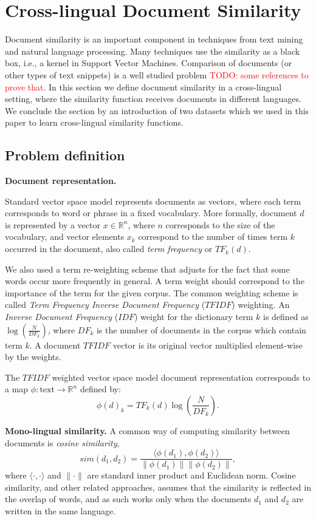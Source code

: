 \documentclass[twoside,11pt]{article}
\newcommand{\todo}[1]{\textcolor{red}{TODO: #1}}
\newcommand{\RR}{\mathbb{R}}
\begin{document}
\section{Cross-lingual Document Similarity}

Document similarity is an important component in techniques from text mining and natural language processing. Many techniques use the similarity as a black box, i.e., a kernel in Support Vector Machines. Comparison of documents (or other types of text snippets) is a well studied problem \todo{some references to prove that}. In this section we define document similarity in a cross-lingual setting, where the similarity function receives documents in different languages. We conclude the section by an introduction of two datasets which we used in this paper to learn cross-lingual similarity functions.

\subsection{Problem definition}

\textbf{Document representation.}

Standard vector space model \cite{xxx} represents documents as vectors, where each term corresponds to word or phrase in a fixed vocabulary. More formally, document $d$ is represented by a vector $x \in \RR^n$, where $n$ corresponds to the size of the vocabulary, and vector elements $x_k$ correspond to the number of times term $k$ occurred in the document, also called \emph{term frequency} or $TF_k(d)$.

We also used a term re-weighting scheme that adjusts for the fact that some words occur more frequently in general. A term weight should correspond to the importance of the term for the given corpus. The common weighting scheme is called \emph{Term Frequency Inverse Document Frequency} ($TFIDF$) weighting. An \emph{Inverse Document Frequency} ($IDF$) weight for the dictionary term $k$ is defined as $\log( \frac{N}{DF_k} )$, where $DF_k$ is the number of documents in the corpus which contain term $k$.  A document $TFIDF$ vector is its original vector multiplied element-wise by the weights.

The $TFIDF$ weighted vector space model document representation corresponds to a map $\phi : \text{text} \rightarrow \RR^n$ defined by:
$$\phi(d)_k = {TF}_k(d) \log( \frac{N}{{DF}_k}).$$

\textbf {Mono-lingual similarity.}
A common way of computing similarity between documents is \emph{cosine similarity},
$$sim(d_1, d_2) = \frac{\langle \phi(d_1), \phi(d_2)\rangle}{\|\phi(d_1)\| \|\phi(d_2)\|},$$
where $\langle \cdot,\cdot \rangle$ and $\|\cdot\|$ are standard inner product and Euclidean norm. Cosine similarity, and other related approaches, assumes that the similarity is reflected in the overlap of words, and as such works only when the documents $d_1$ and $d_2$ are written in the same language.
\end{document}
